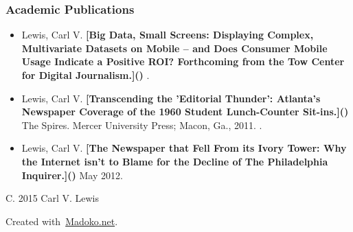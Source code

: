 \documentclass{article}
\begin{document}
\subsubsection{Academic Publications}\label{sec-academic-publications}%

\begin{itemize}[noitemsep,topsep=\mdcompacttopsep]%

\item{}Lewis, Carl V. \textbf{[Big Data, Small Screens: Displaying Complex, Multivariate Datasets on Mobile – and Does Consumer Mobile Usage Indicate a Positive ROI? Forthcoming from the Tow Center for Digital Journalism.]()} .%

\item{}Lewis, Carl V. \textbf{[Transcending the 'Editorial Thunder': Atlanta's Newspaper Coverage of the 1960 Student Lunch-Counter Sit-ins.]()} The Spires. Mercer University Press; Macon, Ga., 2011. .%

\item{}Lewis, Carl V. \textbf{[The Newspaper that Fell From its Ivory Tower: Why the Internet isn't to Blame for the Decline of The Philadelphia Inquirer.]()} May 2012.%
\end{itemize}%

\mdhr{}%

\noindent{}C. 2015 Carl V. Lewis%

\begin{mdbmargintb}{4em}{}%
\begin{mdflushright}%
{\tiny{}Created with~\href{https://www.madoko.net}{Madoko.net}.}%
\end{mdflushright}%
\end{mdbmargintb}%
\end{document}
